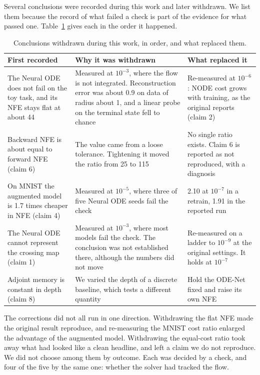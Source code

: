 Several conclusions were recorded during this work and later withdrawn. We list them because
the record of what failed a check is part of the evidence for what passed one.
Table~\ref{tab:withdrawn} gives each in the order it happened.

\begin{table}[h]
  \centering
  \small
  \caption{Conclusions withdrawn during this work, in order, and what replaced them.}
  \label{tab:withdrawn}
  \begin{tabularx}{\linewidth}{@{}XXX@{}}
    \toprule
    First recorded & Why it was withdrawn & What replaced it \\
    \midrule
    The Neural ODE does not fail on the toy task, and its NFE stays flat at about 44 &
      Measured at $10^{-3}$, where the flow is not integrated. Reconstruction error was about
      0.9 on data of radius about 1, and a linear probe on the terminal state fell to chance &
      Re-measured at $10^{-6}$: NODE cost grows with training, as the original reports (claim 2) \\
    Backward NFE is about equal to forward NFE (claim 6) &
      The value came from a loose tolerance. Tightening it moved the ratio from 25 to 115 &
      No single ratio exists. Claim 6 is reported as not reproduced, with a diagnosis \\
    On MNIST the augmented model is 1.7 times cheaper in NFE (claim 4) &
      Measured at $10^{-5}$, where three of five Neural ODE seeds fail the check &
      2.10 at $10^{-7}$ in a retrain, 1.91 in the reported run \\
    The Neural ODE cannot represent the crossing map (claim 1) &
      Measured at $10^{-3}$, where most models fail the check. The conclusion was not
      established there, although the numbers did not move &
      Re-measured on a ladder to $10^{-9}$ at the original settings. It holds at $10^{-7}$ \\
    Adjoint memory is constant in depth (claim 8) &
      We varied the depth of a discrete baseline, which tests a different quantity &
      Hold the ODE-Net fixed and raise its own NFE \\
    \bottomrule
  \end{tabularx}
\end{table}

The corrections did not all run in one direction. Withdrawing the flat NFE made the original
result reproduce, and re-measuring the MNIST cost ratio enlarged the advantage of the augmented
model. Withdrawing the equal-cost ratio took away what had looked like a clean headline, and
left a claim we do not reproduce. We did not choose among them by outcome. Each was decided by a
check, and four of the five by the same one: whether the solver had tracked the flow.

